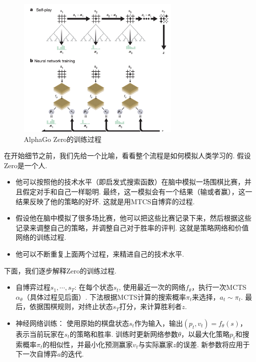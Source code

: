 \begin{figure}[ht]
\centering
\includegraphics[width=0.7\textwidth]{Figures/game/alphazero.png}
    \caption{AlphaGo Zero的训练过程}
    \label{fig:alphago-zero}
\end{figure}

在开始细节之前，我们先给一个比喻，看看整个流程是如何模拟人类学习的. 假设Zero是一个人. 
\begin{itemize}
    \item 他可以按照他的技术水平（即启发式搜索函数）在脑中模拟一场围棋比赛，并且假定对手和自己一样聪明. 最终，这一模拟会有一个结果（输或者赢），这一结果反映了他的策略的好坏. 这就是用MTCS自博弈的过程.
    \item 假设他在脑中模拟了很多场比赛，他可以把这些比赛记录下来，然后根据这些记录来调整自己的策略，并调整自己对于胜率的评判. 这就是策略网络和价值网络的训练过程.
    \item 他可以不断重复上面两个过程，来精进自己的技术水平. 
\end{itemize}

下面，我们逐步解释Zero的训练过程.

\begin{itemize}
    \item 自博弈过程$s_1,\cdots,s_T$: 在每个状态$s_t$, 使用最近一次的网络$f_\theta$，执行一次MCTS $\alpha_\theta$（具体过程见后面）. 下法根据MCTS计算的搜索概率$\pi_t$来选择，$a_t\sim\pi_t$. 最后，依据围棋规则，对终止状态$s_T$打分，来计算胜利者$z$. 
    \item 神经网络训练： 使用原始的棋盘状态$s_t$作为输入，输出$(p_t,v_t)=f_\theta(s)$，表示当前玩家在$s_t$的策略和胜率. 训练时更新网络参数$\theta$，以最大化策略$p_t$和搜索概率$\pi_t$的相似性，并最小化预测赢家$v_t$与实际赢家$z$的误差. 新参数将应用于下一次自博弈$a$的迭代.     
\end{itemize}

